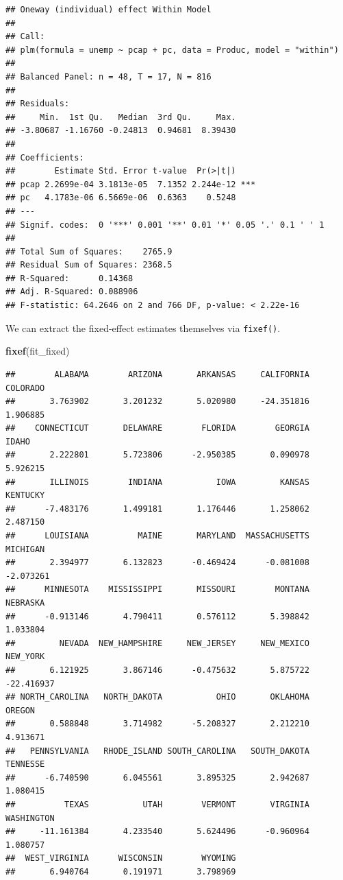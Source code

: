 \documentclass[12pt,oneside,openany]{book}
\newenvironment{Shaded}{\begin{snugshade}}{\end{snugshade}}
\newcommand{\KeywordTok}[1]{\textcolor[rgb]{0.13,0.29,0.53}{\textbf{#1}}}
\newcommand{\NormalTok}[1]{#1}
\begin{document}
\begin{verbatim}
## Oneway (individual) effect Within Model
## 
## Call:
## plm(formula = unemp ~ pcap + pc, data = Produc, model = "within")
## 
## Balanced Panel: n = 48, T = 17, N = 816
## 
## Residuals:
##     Min.  1st Qu.   Median  3rd Qu.     Max. 
## -3.80687 -1.16760 -0.24813  0.94681  8.39430 
## 
## Coefficients:
##        Estimate Std. Error t-value  Pr(>|t|)    
## pcap 2.2699e-04 3.1813e-05  7.1352 2.244e-12 ***
## pc   4.1783e-06 6.5669e-06  0.6363    0.5248    
## ---
## Signif. codes:  0 '***' 0.001 '**' 0.01 '*' 0.05 '.' 0.1 ' ' 1
## 
## Total Sum of Squares:    2765.9
## Residual Sum of Squares: 2368.5
## R-Squared:      0.14368
## Adj. R-Squared: 0.088906
## F-statistic: 64.2646 on 2 and 766 DF, p-value: < 2.22e-16
\end{verbatim}

We can extract the fixed-effect estimates themselves via
\texttt{fixef()}.

\begin{Shaded}
\begin{Highlighting}[]
\KeywordTok{fixef}\NormalTok{(fit_fixed)}
\end{Highlighting}
\end{Shaded}

\begin{verbatim}
##        ALABAMA        ARIZONA       ARKANSAS     CALIFORNIA       COLORADO 
##       3.763902       3.201232       5.020980     -24.351816       1.906885 
##    CONNECTICUT       DELAWARE        FLORIDA        GEORGIA          IDAHO 
##       2.222801       5.723806      -2.950385       0.090978       5.926215 
##       ILLINOIS        INDIANA           IOWA         KANSAS       KENTUCKY 
##      -7.483176       1.499181       1.176446       1.258062       2.487150 
##      LOUISIANA          MAINE       MARYLAND  MASSACHUSETTS       MICHIGAN 
##       2.394977       6.132823      -0.469424      -0.081008      -2.073261 
##      MINNESOTA    MISSISSIPPI       MISSOURI        MONTANA       NEBRASKA 
##      -0.913146       4.790411       0.576112       5.398842       1.033804 
##         NEVADA  NEW_HAMPSHIRE     NEW_JERSEY     NEW_MEXICO       NEW_YORK 
##       6.121925       3.867146      -0.475632       5.875722     -22.416937 
## NORTH_CAROLINA   NORTH_DAKOTA           OHIO       OKLAHOMA         OREGON 
##       0.588848       3.714982      -5.208327       2.212210       4.913671 
##   PENNSYLVANIA   RHODE_ISLAND SOUTH_CAROLINA   SOUTH_DAKOTA       TENNESSE 
##      -6.740590       6.045561       3.895325       2.942687       1.080415 
##          TEXAS           UTAH        VERMONT       VIRGINIA     WASHINGTON 
##     -11.161384       4.233540       5.624496      -0.960964       1.080757 
##  WEST_VIRGINIA      WISCONSIN        WYOMING 
##       6.940764       0.191971       3.798969
\end{verbatim}
\end{document}
